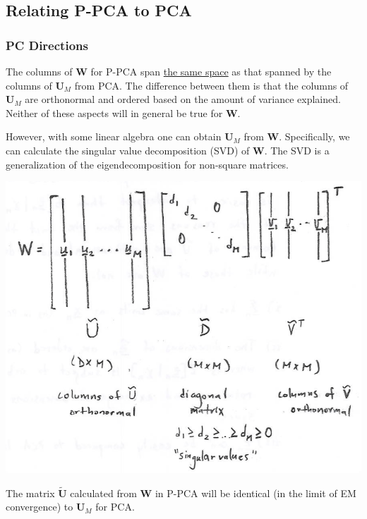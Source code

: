 \documentclass[11pt]{article}
\newcommand{\Wb}{\mathbf{W}}
\begin{document}
\subsection{Relating P-PCA to PCA}
\subsubsection*{PC Directions}
The columns of $\Wb$ for P-PCA span \underline{the same space} as that spanned
by the columns of $\mathbf{U}_M$ from PCA. The difference between them is that
the columns of $\mathbf{U}_M$ are orthonormal and ordered based on the amount
of variance explained. Neither of these aspects will in general be true for
$\Wb$.

However, with some linear algebra one can obtain $\mathbf{U}_M$ from $\Wb$.
Specifically, we can calculate the singular value decomposition (SVD) of $\Wb$.
The SVD is a generalization of the eigendecomposition for non-square matrices.
\begin{center}
  \includegraphics[scale=0.5]{SVD.png}
\end{center}
The matrix $\tilde{\mathbf{U}}$ calculated from $\Wb$ in P-PCA will be identical
(in the limit of EM convergence) to $\mathbf{U}_M$ for PCA.
\end{document}
